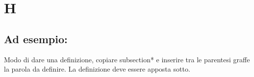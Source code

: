 \section*{H}
\markright{}
\subsection*{Ad esempio:}
Modo di dare una definizione, copiare subsection*{} e inserire tra le parentesi graffe la parola da definire. La definizione deve essere apposta sotto.